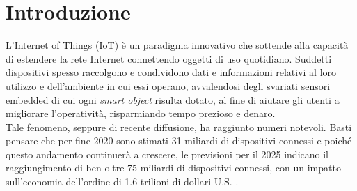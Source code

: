 \chapter*{Introduzione}
\label{ch:introduzione}


L'Internet of Things (IoT) è un paradigma innovativo che sottende alla capacità di estendere la rete Internet connettendo oggetti di uso quotidiano.
Suddetti dispositivi spesso raccolgono e condividono dati e informazioni relativi al loro utilizzo e dell'ambiente in cui essi operano, avvalendosi degli svariati sensori embedded di cui ogni \textit{smart object} risulta dotato, al fine di aiutare gli utenti a migliorare l'operatività, risparmiando tempo prezioso e denaro. \\
Tale fenomeno, seppure di recente diffusione, ha raggiunto numeri notevoli. Basti pensare che per fine 2020 sono stimati 31 miliardi di dispositivi connessi e poiché questo andamento continuerà a crescere, le previsioni per il 2025 indicano il raggiungimento di ben oltre 75 miliardi di dispositivi connessi, con un impatto sull'economia dell'ordine di 1.6 trilioni di dollari U.S. \cite{statista2020iot, statista2016iot}.\\

